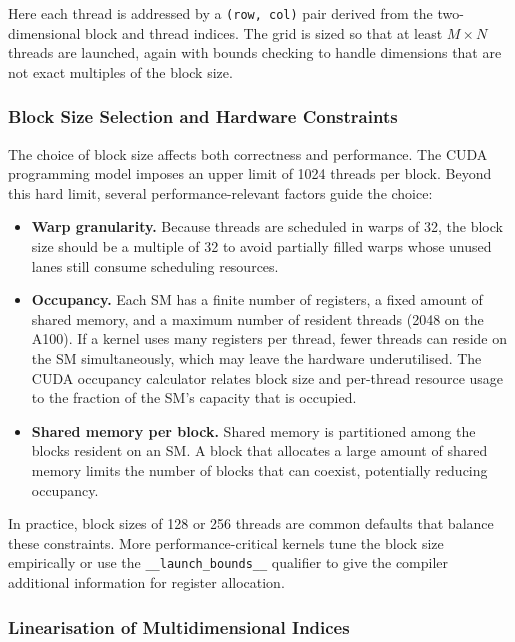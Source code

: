 Here each thread is addressed by a \texttt{(row, col)} pair derived from the two-dimensional block and thread indices. The grid is sized so that at least $M \times N$ threads are launched, again with bounds checking to handle dimensions that are not exact multiples of the block size.

\subsubsection{Block Size Selection and Hardware Constraints}\label{sec:block-size}

The choice of block size affects both correctness and performance. The CUDA programming model imposes an upper limit of 1024 threads per block. Beyond this hard limit, several performance-relevant factors guide the choice:

\begin{itemize}
  \item \textbf{Warp granularity.} Because threads are scheduled in warps of 32, the block size should be a multiple of 32 to avoid partially filled warps whose unused lanes still consume scheduling resources.
  \item \textbf{Occupancy.} Each SM has a finite number of registers, a fixed amount of shared memory, and a maximum number of resident threads (\num{2048} on the A100). If a kernel uses many registers per thread, fewer threads can reside on the SM simultaneously, which may leave the hardware underutilised. The CUDA occupancy calculator relates block size and per-thread resource usage to the fraction of the SM's capacity that is occupied.
  \item \textbf{Shared memory per block.} Shared memory is partitioned among the blocks resident on an SM. A block that allocates a large amount of shared memory limits the number of blocks that can coexist, potentially reducing occupancy.
\end{itemize}

In practice, block sizes of 128 or 256 threads are common defaults that balance these constraints. More performance-critical kernels tune the block size empirically or use the \lstinline[language=CUDA]{__launch_bounds__} qualifier to give the compiler additional information for register allocation.

\subsubsection{Linearisation of Multidimensional Indices}\label{sec:linearisation}

